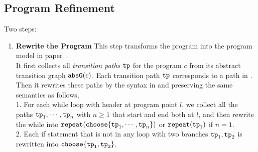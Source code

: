 \subsection{Program Refinement}
\label{sec:refine}
Two steps:
\begin{enumerate}
\item \textbf{Rewrite the Program}
This step transforms the program into the program model in paper~\cite{GulwaniJK09}. 
\\
It first collects all \emph{transition paths} $\mathtt{tp}$ for the program $c$ from its abstract transition graph $\mathtt{abs}{\mathtt{G}}(c)$.
%
Each transition path $\mathtt{tp}$ corresponds to a path in \cite{GulwaniJK09}.
%
\\
Then it rewrites these paths by the syntax in \cite{GulwaniJK09} and preserving the same semantics as follows,
\\
1. For each while loop with header at program point $l$, we
collect all the paths $\mathtt{tp}_1, \cdots , \mathtt{tp}_n$ with $n \geq 1$ that start and end both at $l$, 
and then rewrite the while into  $\rprepeat(\rpchoose{\tpath_1, \cdots, \tpath_n})$ or $\mathtt{repeat}(\mathtt{tp}_1)$ if $n = 1$.
\\
2. Each if statement that is not in any loop with two branches $\mathtt{tp}_1, \mathtt{tp}_2$
is rewritten into $\rpchoose{\tpath_1, \tpath_2 }$.

\end{enumerate}
